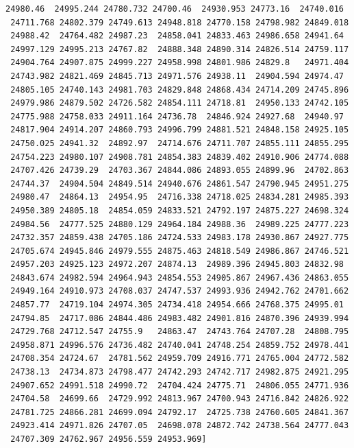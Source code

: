 \documentclass[11pt]{article}
\begin{document}
\begin{Verbatim}[commandchars=\\\{\}]
 24980.46  24995.244 24780.732 24700.46  24930.953 24773.16  24740.016
 24711.768 24802.379 24749.613 24948.818 24770.158 24798.982 24849.018
 24988.42  24764.482 24987.23  24858.041 24833.463 24986.658 24941.64
 24997.129 24995.213 24767.82  24888.348 24890.314 24826.514 24759.117
 24904.764 24907.875 24999.227 24958.998 24801.986 24829.8   24971.404
 24743.982 24821.469 24845.713 24971.576 24938.11  24904.594 24974.47
 24805.105 24740.143 24981.703 24829.848 24868.434 24714.209 24745.896
 24979.986 24879.502 24726.582 24854.111 24718.81  24950.133 24742.105
 24775.988 24758.033 24911.164 24736.78  24846.924 24927.68  24940.97
 24817.904 24914.207 24860.793 24996.799 24881.521 24848.158 24925.105
 24750.025 24941.32  24892.97  24714.676 24711.707 24855.111 24855.295
 24754.223 24980.107 24908.781 24854.383 24839.402 24910.906 24774.088
 24707.426 24739.29  24703.367 24844.086 24893.055 24899.96  24702.863
 24744.37  24904.504 24849.514 24940.676 24861.547 24790.945 24951.275
 24980.47  24864.13  24954.95  24716.338 24718.025 24834.281 24985.393
 24950.389 24805.18  24854.059 24833.521 24792.197 24875.227 24698.324
 24984.56  24777.525 24880.129 24964.184 24988.36  24989.225 24777.223
 24732.357 24859.438 24705.186 24724.533 24983.178 24930.867 24927.775
 24705.674 24945.846 24979.555 24875.463 24818.549 24986.867 24746.521
 24957.203 24925.123 24972.207 24874.13  24989.396 24945.803 24832.98
 24843.674 24982.594 24964.943 24854.553 24905.867 24967.436 24863.055
 24949.164 24910.973 24708.037 24747.537 24993.936 24942.762 24701.662
 24857.77  24719.104 24974.305 24734.418 24954.666 24768.375 24995.01
 24794.85  24717.086 24844.486 24983.482 24901.816 24870.396 24939.994
 24729.768 24712.547 24755.9   24863.47  24743.764 24707.28  24808.795
 24958.871 24996.576 24736.482 24740.041 24748.254 24859.752 24978.441
 24708.354 24724.67  24781.562 24959.709 24916.771 24765.004 24772.582
 24738.13  24734.873 24798.477 24742.293 24742.717 24982.875 24921.295
 24907.652 24991.518 24990.72  24704.424 24775.71  24806.055 24771.936
 24704.58  24699.66  24729.992 24813.967 24700.943 24716.842 24826.922
 24781.725 24866.281 24699.094 24792.17  24725.738 24760.605 24841.367
 24923.414 24971.826 24707.05  24698.078 24872.742 24738.564 24777.043
 24707.309 24762.967 24956.559 24953.969]


\end{Verbatim}
\end{document}
